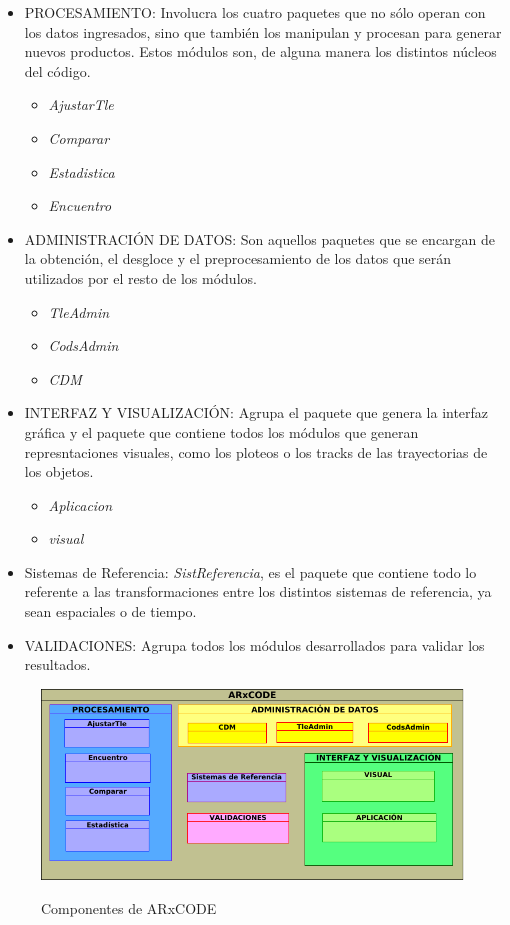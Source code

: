 \begin{itemize}
 \item PROCESAMIENTO: Involucra los cuatro paquetes que no s\'olo operan con los datos ingresados, sino que tambi\'en los manipulan y procesan para generar nuevos productos. Estos m\'odulos son, de alguna manera los distintos n\'ucleos del c\'odigo.\\
 \begin{itemize}
 \itemsep0em
  \item {\it{AjustarTle}}
  \item {\it{Comparar}}
  \item {\it{Estadistica}}
  \item {\it{Encuentro}}
 \end{itemize}
 \item ADMINISTRACI\'ON DE DATOS: Son aquellos paquetes que se encargan de la obtenci\'on, el desgloce y el preprocesamiento de los datos que ser\'an utilizados por el resto de los m\'odulos.
 \begin{itemize}
 \itemsep0em
  \item {\it{TleAdmin}}
  \item {\it{CodsAdmin}}
  \item {\it{CDM}}
 \end{itemize}
 \item INTERFAZ Y VISUALIZACI\'ON: Agrupa el paquete que genera la interfaz gr\'afica y el paquete que contiene todos los m\'odulos que generan represntaciones visuales, como los ploteos o los tracks de las trayectorias de los objetos.\\
 \begin{itemize}
 \itemsep0em
 \item {\it{Aplicacion}}
 \item {\it{visual}}
 \end{itemize}
 \item Sistemas de Referencia: {\it{SistReferencia}}, es el paquete que contiene todo lo referente a las transformaciones entre los distintos sistemas de referencia, ya sean espaciales o de tiempo.
 \item VALIDACIONES: Agrupa todos los m\'odulos desarrollados para validar los resultados.
\end{itemize}


\begin{figure}[h!]
  \centering
  \includegraphics[width=.8\textwidth]{imagenes/componentesAR}
  \label{fig:componentes}
  \caption{Componentes de ARxCODE}
\end{figure}


